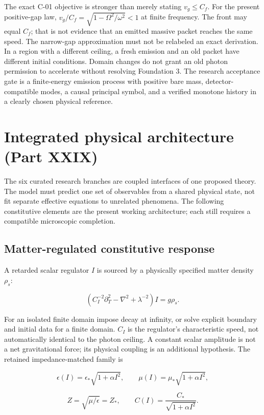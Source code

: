 \documentclass[
  11pt,
  twoside]{article}
\begin{document}
The exact C-01 objective is stronger than merely stating
\(v_g\leq C_f\). For the present positive-gap law,
\(v_g/C_f=\sqrt{1-\Omega^2/\omega^2}<1\) at finite frequency. The front
may equal \(C_f\); that is not evidence that an emitted massive packet
reaches the same speed. The narrow-gap approximation must not be
relabeled an exact derivation. In a region with a different ceiling, a
fresh emission and an old packet have different initial conditions.
Domain changes do not grant an old photon permission to accelerate
without resolving Foundation 3. The research acceptance gate is a
finite-energy emission process with positive bare mass,
detector-compatible modes, a causal principal symbol, and a verified
monotone history in a clearly chosen physical reference.

\section{Integrated physical architecture (Part
XXIX)}\label{integrated-physical-architecture-part-xxix}

The six curated research branches are coupled interfaces of one proposed
theory. The model must predict one set of observables from a shared
physical state, not fit separate effective equations to unrelated
phenomena. The following constitutive elements are the present working
architecture; each still requires a compatible microscopic completion.

\subsection{Matter-regulated constitutive
response}\label{matter-regulated-constitutive-response}

A retarded scalar regulator \(I\) is sourced by a physically specified
matter density \(\rho_s\):

\[\left(C_I^{-2}\partial_T^2-\nabla^2+\lambda^{-2}\right)I=g\rho_s.\]

For an isolated finite domain impose decay at infinity, or solve
explicit boundary and initial data for a finite domain. \(C_I\) is the
regulator's characteristic speed, not automatically identical to the
photon ceiling. A constant scalar amplitude is not a net gravitational
force; its physical coupling is an additional hypothesis. The retained
impedance-matched family is

\[\epsilon(I)=\epsilon_*\sqrt{1+\alpha I^2},\qquad \mu(I)=\mu_*\sqrt{1+\alpha I^2},\]

\[Z=\sqrt{\mu/\epsilon}=Z_*,\qquad C(I)=\frac{C_*}{\sqrt{1+\alpha I^2}}.\]
\end{document}
